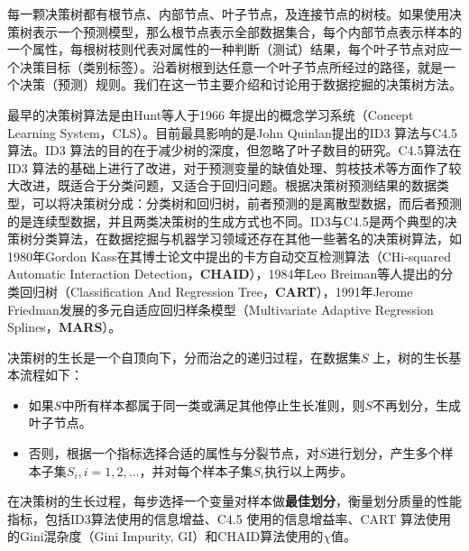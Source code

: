 每一颗决策树都有根节点、内部节点、叶子节点，及连接节点的树枝。如果使用决策树表示一个预测模型，那么根节点表示全部数据集合，每个内部节点表示样本的一个属性，每根树枝则代表对属性的一种判断（测试）结果，每个叶子节点对应一个决策目标（类别标签）。沿着树根到达任意一个叶子节点所经过的路径，就是一个决策（预测）规则。我们在这一节主要介绍和讨论用于数据挖掘的决策树方法。

最早的决策树算法是由Hunt等人\cite{hunt1966experiments}于1966 年提出的概念学习系统（Concept Learning System，CLS）。目前最具影响的是John Quinlan提出的ID3 算法\cite{quinlan1986induction}与C4.5算法\cite{quinlan1993c4}。ID3 算法的目的在于减少树的深度，但忽略了叶子数目的研究。C4.5算法在ID3 算法的基础上进行了改进，对于预测变量的缺值处理、剪枝技术等方面作了较大改进，既适合于分类问题，又适合于回归问题。根据决策树预测结果的数据类型，可以将决策树分成：分类树和回归树，前者预测的是离散型数据，而后者预测的是连续型数据，并且两类决策树的生成方式也不同。ID3与C4.5是两个典型的决策树分类算法，在数据挖掘与机器学习领域还存在其他一些著名的决策树算法，如1980年Gordon Kass\cite{kass1980exploratory}在其博士论文中提出的卡方自动交互检测算法（CHi-squared Automatic Interaction Detection，\textbf{CHAID}），1984年Leo Breiman等人\cite{breiman1993classification}提出的分类回归树（Classification And Regression Tree，\textbf{CART}），1991年Jerome Friedman\cite{friedman1991multivariate}发展的多元自适应回归样条模型（Multivariate Adaptive Regression Splines，\textbf{MARS}）。

决策树的生长是一个自顶向下，分而治之的递归过程，在数据集$S$ 上，树的生长基本流程如下：
\begin{itemize}
  \item 如果$S$中所有样本都属于同一类或满足其他停止生长准则，则$S$不再划分，生成叶子节点。
  \item 否则，根据一个指标选择合适的属性与分裂节点，对$S$进行划分，产生多个样本子集$S_i,i=1,2,\dots$，并对每个样本子集$S_i$执行以上两步。
\end{itemize}
在决策树的生长过程，每步选择一个变量对样本做\textbf{最佳划分}，衡量划分质量的性能指标，包括ID3算法使用的信息增益、C4.5 使用的信息增益率、CART 算法使用的Gini混杂度（Gini Impurity, GI）和CHAID算法使用的$\chi$值。

